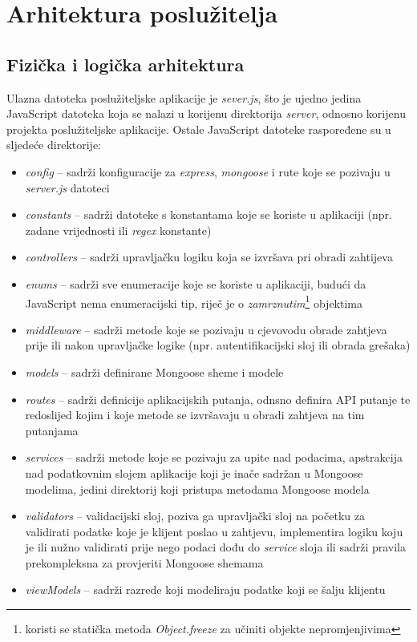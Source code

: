 \documentclass[times, utf8, diplomski, numeric]{fer}
\newcommand{\razmaks}{\vspace{10pt}}
\begin{document}
\newpage
\section{Arhitektura poslužitelja}

\razmaks
\subsection{Fizička i logička arhitektura}

Ulazna datoteka poslužiteljske aplikacije je \emph{sever.js}, što je ujedno jedina JavaScript datoteka koja se nalazi u korijenu direktorija \emph{server}, odnosno korijenu projekta poslužiteljske aplikacije.
Ostale JavaScript datoteke raspoređene su u sljedeće direktorije:

\begin{itemize}
    \item \emph{config} -- sadrži konfiguracije za \emph{express}, \emph{mongoose} i rute koje se pozivaju u \emph{server.js} datoteci
    \item \emph{constants} -- sadrži datoteke s konstantama koje se koriste u aplikaciji (npr. zadane vrijednosti ili \emph{regex} konstante)
    \item \emph{controllers} -- sadrži upravljačku logiku koja se izvršava pri obradi zahtijeva
    \item \emph{enums} -- sadrži sve enumeracije koje se koriste u aplikaciji, budući da JavaScript nema enumeracijski tip, riječ je o \emph{zamrznutim}\footnote{
        koristi se statička metoda \emph{Object.freeze} za učiniti objekte nepromjenjivima 
    } objektima
    \item \emph{middleware} -- sadrži metode koje se pozivaju u cjevovodu  obrade zahtjeva prije ili nakon upravljačke logike (npr. autentifikacijski sloj ili obrada grešaka)
    \item \emph{models} -- sadrži definirane Mongoose sheme i modele
    \item \emph{routes} -- sadrži definicije aplikacijskih putanja, odnsno definira API putanje te redoslijed kojim i koje metode se izvršavaju u obradi zahtjeva na tim putanjama
    \item \emph{services} -- sadrži metode koje se pozivaju za upite nad podacima, apstrakcija nad podatkovnim slojem aplikacije koji je inače sadržan u Mongoose modelima, jedini direktorij koji pristupa metodama Mongoose modela
    \item \emph{validators} -- validacijski sloj, poziva ga upravljački sloj na početku za validirati podatke koje je klijent poslao u zahtjevu, implementira logiku koju je ili nužno validirati prije nego podaci dođu do \emph{service} sloja ili sadrži pravila prekompleksna za provjeriti Mongoose shemama
    \item \emph{viewModels} -- sadrži razrede koji modeliraju podatke koji se šalju klijentu
\end{itemize}
\razmaks
\end{document}
